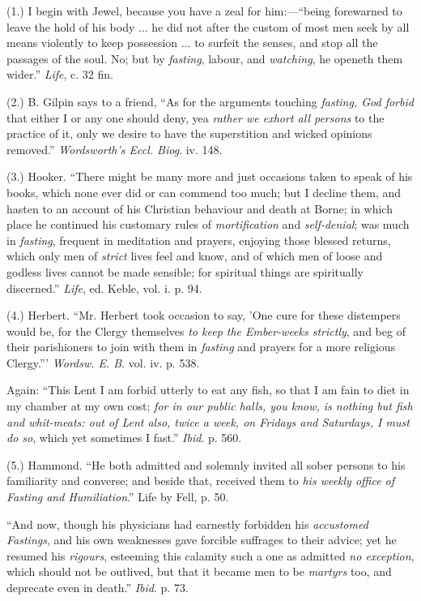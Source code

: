 (1.) I begin with Jewel, because you have a zeal
for him:—``being forewarned to leave the hold of his body ... he did
not after the custom of most men seek by all means violently to keep
possession ... to surfeit the senses, and stop all the passages of the
soul. No; but by \emph{fasting}, labour, and \emph{watching}, he
openeth them wider.'' \emph{Life}, c. 32 fin.

(2.) B. Gilpin says to a friend, ``As for the
arguments touching \emph{fasting, God forbid} that either I or any one
should deny, yea \emph{rather we exhort all persons} to the
practice of it, only we desire to have the superstition and wicked
opinions removed.'' \emph{Wordsworth's Eccl. Biog}. iv. 148.

(3.) Hooker. ``There might be many more and just
occasions taken to speak of his books, which none ever did or can
commend too much; but I decline them, and hasten to an account of his
Christian behaviour and death at Borne; in which place he continued
his customary rules of \emph{mortification} and \emph{self-denial};
was much in \emph{fasting}, frequent in meditation and prayers,
enjoying those blessed returns, which only men of \emph{strict} lives
feel and know, and of which men of loose and godless lives cannot be
made sensible; for spiritual things are spiritually discerned.'' \emph{Life},
ed. Keble, vol. i. p. 94.

(4.) Herbert. ``Mr. Herbert took occasion to say,
'One cure for these distempers would be, for the Clergy themselves \emph{to
keep the Ember-weeks strictly}, and beg of their parishioners to
join with them in \emph{fasting} and prayers for a more religious
Clergy.''' \emph{Wordsw. E. B}. vol. iv. p. 538.

Again: ``This Lent I am forbid utterly to eat any
fish, so that I am fain to diet in my chamber at my own cost; \emph{for
in our public halls, you know, is nothing but fish and whit-meats: out
of Lent also, twice a week, on Fridays and Saturdays, I must do so},
which yet sometimes I fast.'' \emph{Ibid}. p. 560.

(5.) Hammond. ``He both admitted and solemnly
invited all sober persons to his familiarity and converse; and beside
that, received them to \emph{his weekly office of Fasting and Humiliation}.''
Life by Fell, p. 50.

``And now, though his physicians had earnestly
forbidden his \emph{accustomed Fastings}, and his own weaknesses gave
forcible suffrages to their advice; yet he resumed his \emph{rigours},
esteeming this calamity such a one as admitted \emph{no exception},
which should not be outlived, but that it became men to be \emph{martyrs}
too, and deprecate even in death.'' \emph{Ibid}. p. 73.

